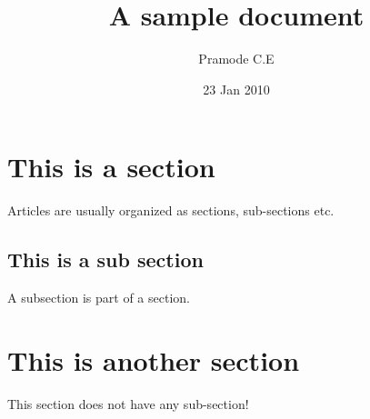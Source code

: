 \documentclass {article}
\title{A sample document}
\author{Pramode C.E}
\date{23 Jan 2010}
\begin{document}
\maketitle
\section{This is a section}
Articles are usually organized as sections, sub-sections etc.

\subsection{This is a sub section}
A subsection is part of a section.

\section{This is another section}
This section does not have any sub-section!
\end{document}
